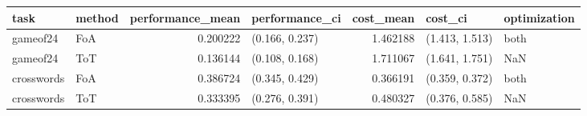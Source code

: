 \begin{tabular}{llrlrll}
\toprule
task & method & performance_mean & performance_ci & cost_mean & cost_ci & optimization \\
\midrule
gameof24 & FoA & 0.200222 & (0.166, 0.237) & 1.462188 & (1.413, 1.513) & both \\
gameof24 & ToT & 0.136144 & (0.108, 0.168) & 1.711067 & (1.641, 1.751) & NaN \\
crosswords & FoA & 0.386724 & (0.345, 0.429) & 0.366191 & (0.359, 0.372) & both \\
crosswords & ToT & 0.333395 & (0.276, 0.391) & 0.480327 & (0.376, 0.585) & NaN \\
\bottomrule
\end{tabular}

